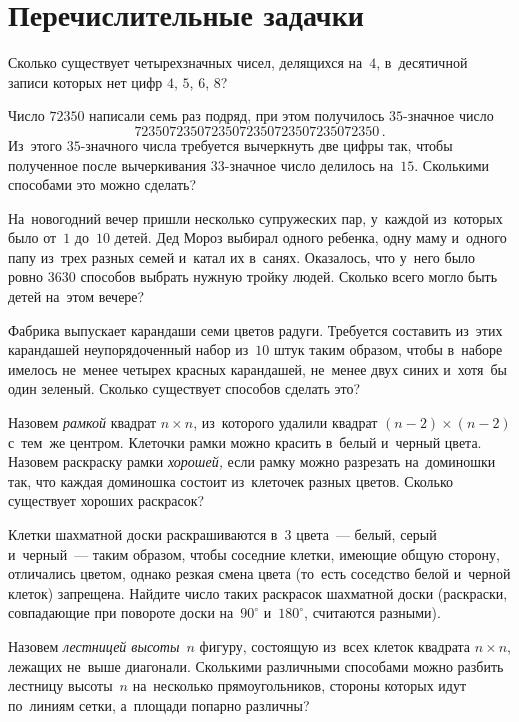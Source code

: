 
\section*{Перечислительные задачки}


\begin{problems}

\item
Сколько существует четырехзначных чисел, делящихся на~$4$, в~десятичной записи
которых нет цифр $4$, $5$, $6$, $8$?

\item
Число $72350$ написали семь раз подряд, при этом получилось $35$-значное число
\[
    72350723507235072350723507235072350
\, .\]
Из~этого $35$-значного числа требуется вычеркнуть две цифры так, чтобы
полученное после вычеркивания $33$-значное число делилось на~$15$.
Сколькими способами это можно сделать?

\item
На~новогодний вечер пришли несколько супружеских пар, у~каждой из~которых было
от~$1$ до~$10$ детей.
Дед Мороз выбирал одного ребенка, одну маму и~одного папу из~трех разных семей
и~катал их в~санях.
Оказалось, что у~него было ровно $3630$ способов выбрать нужную тройку людей.
Сколько всего могло быть детей на~этом вечере?

\item
Фабрика выпускает карандаши семи цветов радуги.
Требуется составить из~этих карандашей неупорядоченный набор из~$10$ штук таким
образом, чтобы в~наборе имелось не~менее четырех красных карандашей, не~менее
двух синих и~хотя~бы один зеленый.
Сколько существует способов сделать это?

\item
Назовем \emph{рамкой} квадрат $n \times n$, из~которого удалили квадрат
$(n - 2) \times (n - 2)$ с~тем~же центром.
Клеточки рамки можно красить в~белый и~черный цвета.
Назовем раскраску рамки \emph{хорошей,} если рамку можно разрезать на~доминошки
так, что каждая доминошка состоит из~клеточек разных цветов.
Сколько существует хороших раскрасок?

\item
Клетки шахматной доски раскрашиваются в~$3$ цвета~--- белый, серый и~черный~---
таким образом, чтобы соседние клетки, имеющие общую сторону, отличались цветом,
однако резкая смена цвета (то~есть соседство белой и~черной клеток) запрещена.
Найдите число таких раскрасок шахматной доски (раскраски, совпадающие при
повороте доски на~$90^{\circ}$ и~$180^{\circ}$, считаются разными).

\item
Назовем \emph{лестницей высоты~$n$} фигуру, состоящую из~всех клеток квадрата
$n \times n$, лежащих не~выше диагонали.
Сколькими различными способами можно разбить лестницу высоты~$n$ на~несколько
прямоугольников, стороны которых идут по~линиям сетки, а~площади попарно
различны?

\end{problems}

